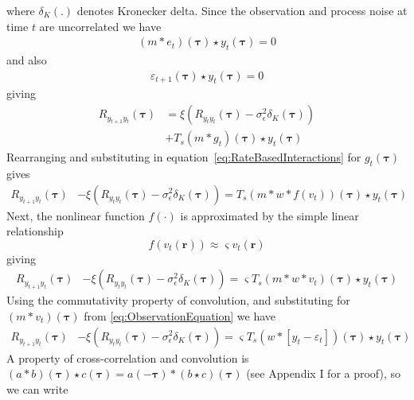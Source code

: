\documentclass[]{article}
\newcommand{\parham}[1]{\textsf{\emph{\textbf{\textcolor{blue}{#1}}}}}
\begin{document}
where $\delta_{K}\left(.\right)$ denotes Kronecker delta. Since the observation and process noise at time $t$ are uncorrelated we have
\begin{align}
(m\ast  e_t)(\boldsymbol\tau) \star y_t(\boldsymbol\tau)=0
\end{align}
and also
\begin{align}
 \varepsilon_{t+1}(\boldsymbol\tau) \star y_t(\boldsymbol\tau)=0
\end{align}
giving 
\begin{align}
	R_{y_{t+1}y_t}(\boldsymbol{\tau}) &= \xi \left(R_{y_ty_t}(\boldsymbol{\tau})-\sigma_{\epsilon}^2  \delta_{K}\left(\boldsymbol\tau\right)\right)\nonumber \\
	&+ T_s(m\ast g_t)(\boldsymbol\tau) \star y_t(\boldsymbol\tau)
\end{align}
Rearranging and substituting in equation~\ref{eq:RateBasedInteractions} for $g_t(\boldsymbol\tau)$ gives
\begin{align}\label{eq:BeforeLinearisation}
	R_{y_{t+1}y_t}(\boldsymbol{\tau}) &-\xi \left(R_{y_ty_t}(\boldsymbol{\tau})-\sigma_{\epsilon}^2  \delta_{K}\left(\boldsymbol\tau\right)\right) =  T_s(m\ast w*f(v_t))(\boldsymbol\tau) \star y_t(\boldsymbol\tau)
\end{align}  
Next, the nonlinear function $f(\cdot)$ is approximated by the simple linear relationship
\begin{equation}
	f\left(v_t(\mathbf{r})\right) \approx \varsigma v_t(\mathbf{r})
\end{equation} 
giving
\begin{align}
	R_{y_{t+1}y_t}(\boldsymbol{\tau}) &-\xi \left(R_{y_ty_t}(\boldsymbol{\tau})-\sigma_{\epsilon}^2  \delta_{K}\left(\boldsymbol\tau\right)\right) = \varsigma T_s (m\ast w\ast v_t)(\boldsymbol\tau)\star y_t(\boldsymbol\tau)
\end{align} 
Using the commutativity property of convolution, and substituting for $(m\ast v_t)(\boldsymbol\tau)$ from \ref{eq:ObservationEquation} we have
\begin{align}
	R_{y_{t+1}y_t}(\boldsymbol{\tau})&-\xi \left(R_{y_ty_t}(\boldsymbol{\tau})-\sigma_{\epsilon}^2  \delta_{K}\left(\boldsymbol\tau\right)\right) =  \varsigma T_s \left( w\ast \left[y_t-\varepsilon_t \right]\right)(\boldsymbol\tau) \star y_t(\boldsymbol\tau)
\end{align}
A property of cross-correlation and convolution is $(a \ast b)(\boldsymbol\tau) \star c(\boldsymbol\tau) = a(-\boldsymbol\tau)\ast(b \star c)(\boldsymbol\tau)$ (see Appendix I for a proof), so we can write
\end{document}
